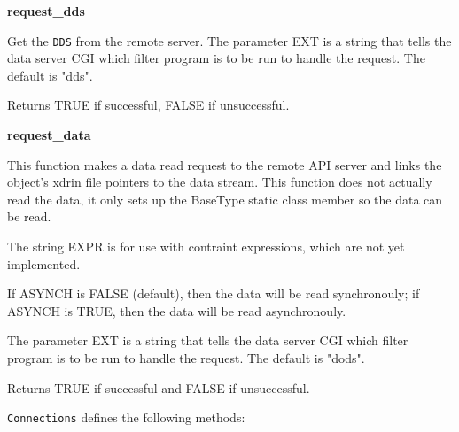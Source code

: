 \begin{description}
\item {\bf request\_dds}


Get the {\tt DDS} from the remote server. The parameter EXT is a string that
tells the data server CGI which filter program is to be run to handle the
request.  The default is "dds".

Returns TRUE if successful, FALSE if unsuccessful.

\item {\bf request\_data}


This function makes a data read request to the remote API server and links
the object's xdrin file pointers to the data stream.  This function does not
actually read the data, it only sets up the BaseType static class member so
the data can be read.

The string EXPR is for use with contraint expressions, which are not yet
implemented.

If ASYNCH is FALSE (default), then the data will be read synchronouly; if
ASYNCH is TRUE, then the data will be read asynchronouly.

The parameter EXT is a string that tells the data server CGI which filter
program is to be run to handle the request.  The default is "dods".

Returns TRUE if successful and FALSE if unsuccessful.

\end{description}

{\tt Connections} defines the following methods:

